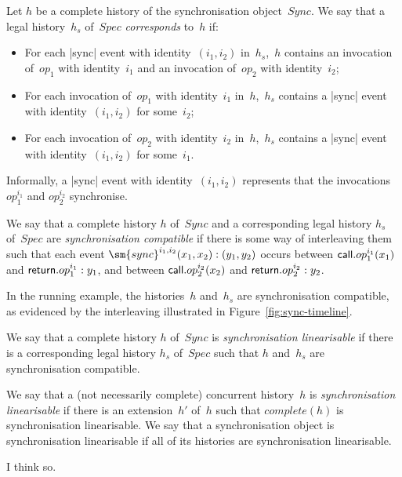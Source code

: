Let $h$ be a complete history of the synchronisation object~$Sync$.  We say
that a legal history~$h_s$ of~$Spec$ \emph{corresponds} to~$h$ if:
%
\begin{itemize}
\item For each |sync| event with identity~$(i_1,i_2)$ in~$h_s$,\, $h$ contains
  an invocation of~$op_1$ with identity~$i_1$ and an invocation of~$op_2$ with
  identity~$i_2$;

\item For each invocation of~$op_1$ with identity~$i_1$ in~$h$,\, $h_s$
  contains a |sync| event with identity~$(i_1,i_2)$ for some~$i_2$;

\item For each invocation of~$op_2$ with identity~$i_2$ in~$h$,\, $h_s$
  contains a |sync| event with identity~$(i_1,i_2)$ for some~$i_1$.
\end{itemize}
%
Informally, a |sync| event with identity~$(i_1,i_2)$ represents that the
invocations $op_1^{i_1}$ and $op_2^{i_2}$ synchronise.

We say that a complete history $h$ of~$Sync$ and a corresponding legal history
$h_s$ of~$Spec$ are \emph{synchronisation compatible} if there is some way of
interleaving them such that each event $\sm{sync}^{i_1, i_2}(x_1, x_2): (y_1,
y_2)$ occurs between $\mathsf{call}.op_1^{i_1}(x_1)$ and $\mathsf{return}.op_1^{i_1}:y_1$, and
between $\mathsf{call}.op_2^{i_2}(x_2)$ and $\mathsf{return}.op_2^{i_2}:y_2$.

In the running example, the histories~$h$ and~$h_s$ are synchronisation
compatible, as evidenced by the interleaving illustrated in
Figure~\ref{fig:sync-timeline}.

We say that a complete history $h$ of~$Sync$ is \emph{synchronisation
  linearisable} if there is a corresponding legal history $h_s$ of~$Spec$ such
that $h$ and~$h_s$ are synchronisation compatible.

We say that a (not necessarily complete) concurrent history~$h$ is
\emph{synchronisation linearisable} if there is an extension~$h'$ of~$h$ such
that $complete(h)$ is synchronisation linearisable.  We say that a
synchronisation object is synchronisation linearisable if all of its histories
are synchronisation linearisable.



  I think so.
